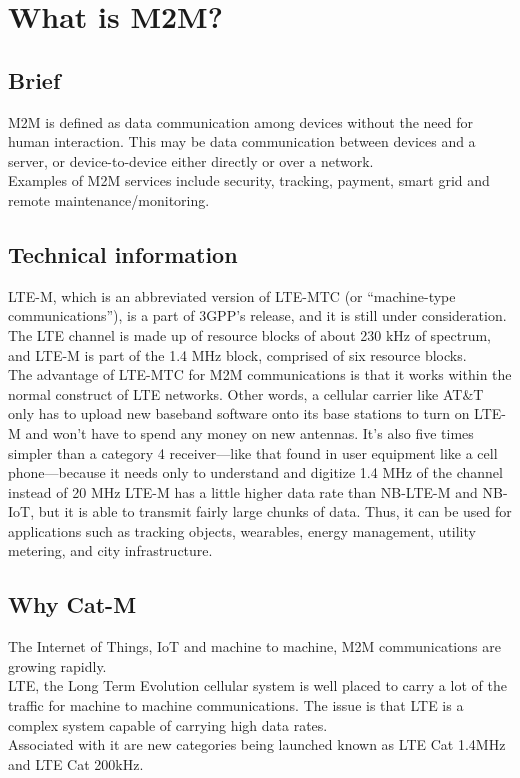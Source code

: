 \documentclass[12pt]{article}
\author{Artur Ziemba  \\
	Zachodniopomorski Uniwersytet Technologiczny w Szczecinie}
\date{\today}
\begin{document}
\maketitle

\tableofcontents %

\section{What is M2M?}
\subsection{Brief}
M2M is defined as data communication among devices without the need for human interaction. This may be data communication between devices and a server, or device-to-device either directly or over a network.\\
Examples of M2M services include security, tracking, payment, smart grid and remote maintenance/monitoring. 

\subsection{Technical information}
LTE-M, which is an abbreviated version of LTE-MTC (or “machine-type communications”), is a part of 3GPP’s release, and it is still under consideration.\\
The LTE channel is made up of resource blocks of about 230 kHz of spectrum, and LTE-M is part of the 1.4 MHz block, comprised of six resource blocks.\\
The advantage of LTE-MTC for M2M communications is that it works within the normal construct of LTE networks. Other words, a cellular carrier like AT\&T  only has to upload new baseband software onto its base stations to turn on LTE-M and won’t have to spend any money on new antennas. It’s also five times simpler than a category 4 receiver—like that found in user equipment like a cell phone—because it needs only to understand and digitize 1.4 MHz of the channel instead of 20 MHz
LTE-M has a little higher data rate than NB-LTE-M and NB-IoT, but it is able to transmit fairly large chunks of data. Thus, it can be used for applications such as tracking objects, wearables, energy management, utility metering, and city infrastructure. 

\subsection{Why Cat-M}
The Internet of Things, IoT and machine to machine, M2M communications are growing rapidly.\\
LTE, the Long Term Evolution cellular system is well placed to carry a lot of the traffic for machine to machine communications.
The issue is that LTE is a complex system capable of carrying high data rates.\\
Associated with it are new categories being launched known as LTE Cat 1.4MHz and LTE Cat 200kHz.
\end{document}
